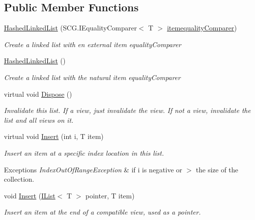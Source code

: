 \subsection*{Public Member Functions}
\begin{DoxyCompactItemize}
\item 
\hyperlink{class_c5_1_1_hashed_linked_list_a2adc87edb033f3ffef4b3b8e0b7ee647}{Hashed\+Linked\+List} (S\+C\+G.\+I\+Equality\+Comparer$<$ T $>$ \hyperlink{class_c5_1_1_collection_base_a95e343400be0e8f3f8d6310f1aaf2cc6}{itemequality\+Comparer})
\begin{DoxyCompactList}\small\item\em Create a linked list with en external item equality\+Comparer \end{DoxyCompactList}\item 
\hyperlink{class_c5_1_1_hashed_linked_list_a84e3034fe412b1ac30c2d06db071dc1d}{Hashed\+Linked\+List} ()
\begin{DoxyCompactList}\small\item\em Create a linked list with the natural item equality\+Comparer \end{DoxyCompactList}\item 
virtual void \hyperlink{class_c5_1_1_hashed_linked_list_aef617151cd77e8458a49ef537dc5f8f8}{Dispose} ()
\begin{DoxyCompactList}\small\item\em Invalidate this list. If a view, just invalidate the view. If not a view, invalidate the list and all views on it. \end{DoxyCompactList}\item 
virtual void \hyperlink{class_c5_1_1_hashed_linked_list_a7aef654591ab7641836af2f7fb29c9cc}{Insert} (int i, T item)
\begin{DoxyCompactList}\small\item\em Insert an item at a specific index location in this list. 
\begin{DoxyExceptions}{Exceptions}
{\em Index\+Out\+Of\+Range\+Exception} & if i is negative or $>$ the size of the collection.\\
\hline
\end{DoxyExceptions}
\end{DoxyCompactList}\item 
void \hyperlink{class_c5_1_1_hashed_linked_list_a3ad04f5ddf6a1a8dd8ca517f7298aee0}{Insert} (\hyperlink{interface_c5_1_1_i_list}{I\+List}$<$ T $>$ pointer, T item)
\begin{DoxyCompactList}\small\item\em Insert an item at the end of a compatible view, used as a pointer. \end{DoxyCompactList}\item 

\end{DoxyCompactItemize}

